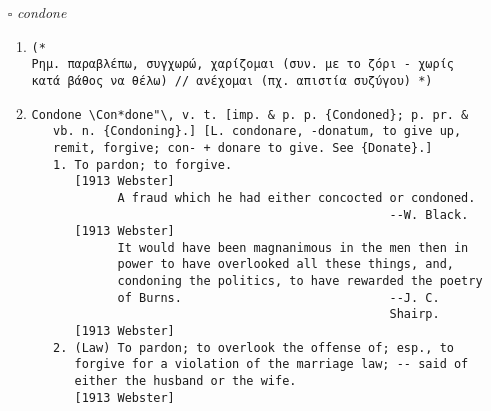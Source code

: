 \documentclass{article}
\begin{document}
\begin{itemize}
\begin{enumerate}
{\begin{lstlisting}
(* 
Ρημ. εμπυούμαι, κακοφορμίζω// ανάβω (για θυμό) Ουσ. πληγή με πύον *)
\end{lstlisting}}
\item{
\begin{lstlisting}
Fester \Fes"ter\, v. i. [imp. & p. p. {Festered}; p. pr. & vb.
   n. {Festering}.] [OE. festern, fr. fester, n.; or fr. OF.
   festrir, fr. festre, n. See {Fester}, n.]
   1. To generate pus; to become imflamed and suppurate; as, a
      sore or a wound festers.
      [1913 Webster]
            Wounds immedicable
            Rankle, and fester, and gangrene.     --Milton.
      [1913 Webster]
            Unkindness may give a wound that shall bleed and
            smart, but it is treachery that makes it fester.
                                                  --South.
      [1913 Webster]
            Hatred . . . festered in the hearts of the children
            of the soil.                          --Macaulay.
      [1913 Webster]
   2. To be inflamed; to grow virulent, or malignant; to grow in
      intensity; to rankle.
      [1913 Webster]
\end{lstlisting}}
\end{enumerate}
\item[$\square$] \emph{ condone }
\begin{enumerate}
\item{
\begin{lstlisting}
(* 
Ρημ. παραβλέπω, συγχωρώ, χαρίζομαι (συν. με το ζόρι - χωρίς κατά βάθος να θέλω) // ανέχομαι (πχ. απιστία συζύγου) *)
\end{lstlisting}}
\item{
\begin{lstlisting}
Condone \Con*done"\, v. t. [imp. & p. p. {Condoned}; p. pr. &
   vb. n. {Condoning}.] [L. condonare, -donatum, to give up,
   remit, forgive; con- + donare to give. See {Donate}.]
   1. To pardon; to forgive.
      [1913 Webster]
            A fraud which he had either concocted or condoned.
                                                  --W. Black.
      [1913 Webster]
            It would have been magnanimous in the men then in
            power to have overlooked all these things, and,
            condoning the politics, to have rewarded the poetry
            of Burns.                             --J. C.
                                                  Shairp.
      [1913 Webster]
   2. (Law) To pardon; to overlook the offense of; esp., to
      forgive for a violation of the marriage law; -- said of
      either the husband or the wife.
      [1913 Webster]

\end{lstlisting}}
\end{enumerate}
\end{itemize}
\end{document}
